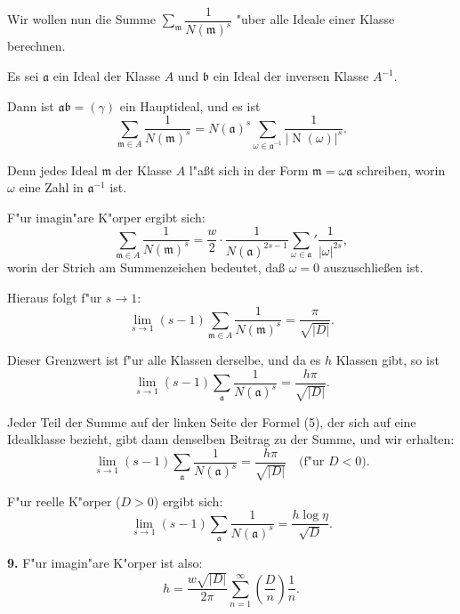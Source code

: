 \documentclass[11pt,a4paper]{article}
\theoremstyle{plain}
\DeclareMathOperator{\Norm}{N}
\begin{document}
Wir wollen nun die Summe $\sum\limits_{\mathfrak{m}} \dfrac{1}{N(\mathfrak{m})^s}$ "{u}ber alle Ideale einer Klasse berechnen.

Es sei $\mathfrak{a}$ ein Ideal der Klasse $A$ und $\mathfrak{b}$ ein Ideal der inversen Klasse $A^{-1}$.

Dann ist $\mathfrak{a}\mathfrak{b} = (\gamma)$ ein Hauptideal, und es ist
\[
\sum_{\mathfrak{m} \in A} \frac{1}{N(\mathfrak{m})^s} = N(\mathfrak{a})^s \sum_{\omega \in \mathfrak{a}^{-1}} \frac{1}{|\Norm(\omega)|^s}.
\]

Denn jedes Ideal $\mathfrak{m}$ der Klasse $A$ l"{a}\ss{}t sich in der Form $\mathfrak{m} = \omega\mathfrak{a}$ schreiben, worin $\omega$ eine Zahl in $\mathfrak{a}^{-1}$ ist.

\smallskip

F"{u}r imagin"{a}re K"{o}rper ergibt sich:
\[
\sum_{\mathfrak{m} \in A} \frac{1}{N(\mathfrak{m})^s} = \frac{w}{2} \cdot \frac{1}{N(\mathfrak{a})^{2s-1}} \sum_{\omega \in \mathfrak{a}}' \frac{1}{|\omega|^{2s}},
\]
worin der Strich am Summenzeichen bedeutet, da\ss{} $\omega = 0$ auszuschlie\ss{}en ist.

\smallskip

Hieraus folgt f"{u}r $s \to 1$:
\[
\lim_{s \to 1} (s-1) \sum_{\mathfrak{m} \in A} \frac{1}{N(\mathfrak{m})^s} = \frac{\pi}{\sqrt{|D|}}.
\]

Dieser Grenzwert ist f"{u}r alle Klassen derselbe, und da es $h$ Klassen gibt, so ist
\[
\lim_{s \to 1} (s-1) \sum_{\mathfrak{a}} \frac{1}{N(\mathfrak{a})^s} = \frac{h\pi}{\sqrt{|D|}}.
\]

\newpage
\setcounter{page}{407}

Jeder Teil der Summe auf der linken Seite der Formel (5), der sich auf eine Idealklasse bezieht, gibt dann denselben Beitrag zu der Summe, und wir erhalten:
\begin{equation}
\label{eq:112_7}
\lim_{s \to 1} (s-1) \sum_{\mathfrak{a}} \frac{1}{N(\mathfrak{a})^s} = \frac{h\pi}{\sqrt{|D|}} \quad \text{(f"{u}r } D < 0\text{)}.
\end{equation}

F"{u}r reelle K"{o}rper ($D > 0$) ergibt sich:
\[
\lim_{s \to 1} (s-1) \sum_{\mathfrak{a}} \frac{1}{N(\mathfrak{a})^s} = \frac{h \log\eta}{\sqrt{D}}.
\]

\smallskip

\textbf{9.} F"{u}r imagin"{a}re K"{o}rper ist also:
\[
h = \frac{w\sqrt{|D|}}{2\pi} \sum_{n=1}^{\infty} \left(\frac{D}{n}\right) \frac{1}{n}.
\]
\end{document}
